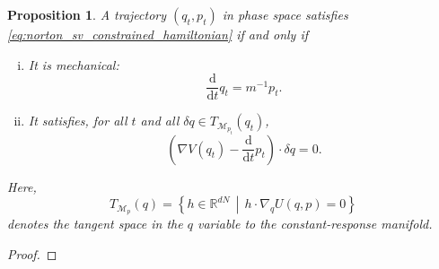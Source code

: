 \documentclass[a4paper,10pt,twoside,leqno]{report}
\newtheorem{prop}{Proposition}
\newcommand{\R}{\mathbb{R}}
\newcommand{\1}{\mathbbm{1}}
\begin{document}
    \begin{prop}
        A trajectory $(q_t,p_t)$ in phase space satisfies \eqref{eq:norton_sv_constrained_hamiltonian} if and only if
            \begin{enumerate}[i)]
                \item It is mechanical: \[ \frac{\mathrm{d}}{\mathrm{d}t}q_t=m^{-1}p_t.\]
                \item It satisfies, for all $t$ and all $\delta q \in T_{\mathcal M_{p_t}}(q_t)$, \[\left(\nabla V(q_t) - \frac{\mathrm{d}}{\mathrm{d}t}p_t\right)\cdot \delta q=0.\]
            \end{enumerate}
            Here, $$T_{\mathcal M_p}(q)=\left\{h\in \R^{dN}\, \middle|\,h\cdot \nabla_q U(q,p)=0 \right\}$$
            denotes the tangent space in the $q$ variable to the constant-response manifold.
    \end{prop}
    \begin{proof}
            
    \end{proof}
\end{document}
